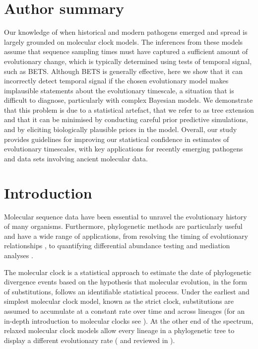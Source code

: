\documentclass[10pt,letterpaper]{article}
\begin{document}
\section*{Author summary}
Our knowledge of when historical and modern pathogens emerged and spread is largely grounded on molecular clock models. The inferences from these models assume that sequence sampling times must have captured a sufficient amount of evolutionary change, which is typically determined using tests of temporal signal, such as BETS. Although BETS is generally effective, here we show that it can incorrectly detect temporal signal if the chosen evolutionary model makes implausible statements about the evolutionary timescale, a situation that is difficult to diagnose, particularly with complex Bayesian models. We demonstrate that this problem is due to a statistical artefact, that we refer to as tree extension and that it can be minimised by conducting careful prior predictive simulations, and by eliciting biologically plausible priors in the model. Overall, our study provides guidelines for improving our statistical confidence in estimates of evolutionary timescales, with key applications for recently emerging pathogens and data sets involving ancient molecular data.

\linenumbers

\section*{Introduction}
Molecular sequence data have been essential to unravel the evolutionary history of many organisms. Furthermore, phylogenetic methods are particularly useful and have a wide range of applications, from resolving the timing of evolutionary relationships \cite{bromham2018bayesian}, to quantifying differential abundance testing and mediation analyses \cite{hong2023phylomed, zhou2021transformation}.

The molecular clock is a statistical approach to estimate the date of phylogenetic divergence events based on the hypothesis that molecular evolution, in the form of substitutions, follows an identifiable statistical process. Under the earliest and simplest molecular clock model, known as the strict clock, substitutions are assumed to accumulate at a constant rate over time and across lineages \cite{zuckerkandl1965evolutionary} {(for an in-depth introduction to molecular clocks see \cite{bromham2018bayesian})}. At the other end of the spectrum, relaxed molecular clock models allow every lineage in a phylogenetic tree to display a different evolutionary rate (\cite{drummond2006relaxed} and reviewed in \cite{ho2014molecular}). 
\end{document}
